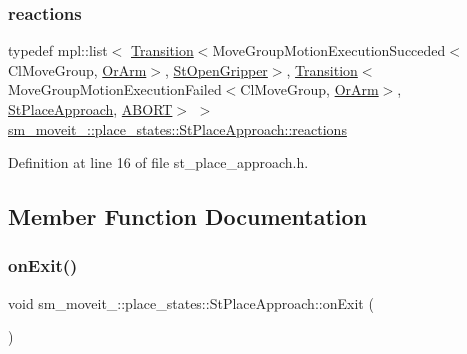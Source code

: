 \subsubsection{\texorpdfstring{reactions}{reactions}}
{\footnotesize\ttfamily typedef mpl\+::list$<$ \hyperlink{classsmacc_1_1Transition}{Transition}$<$Move\+Group\+Motion\+Execution\+Succeded$<$Cl\+Move\+Group, \hyperlink{classsm__moveit__4_1_1OrArm}{Or\+Arm}$>$, \hyperlink{structsm__moveit__4_1_1place__states_1_1StOpenGripper}{St\+Open\+Gripper}$>$, \hyperlink{classsmacc_1_1Transition}{Transition}$<$Move\+Group\+Motion\+Execution\+Failed$<$Cl\+Move\+Group, \hyperlink{classsm__moveit__4_1_1OrArm}{Or\+Arm}$>$, \hyperlink{structsm__moveit__4_1_1place__states_1_1StPlaceApproach}{St\+Place\+Approach}, \hyperlink{structsmacc_1_1default__transition__tags_1_1ABORT}{A\+B\+O\+RT}$>$ $>$ \hyperlink{structsm__moveit__4_1_1place__states_1_1StPlaceApproach_a9aed5942585d30a8f47a96e749f6fa6a}{sm\+\_\+moveit\+\_\+::place\+\_\+states\+::\+St\+Place\+Approach\+::reactions}}



Definition at line 16 of file st\+\_\+place\+\_\+approach.\+h.



\subsection{Member Function Documentation}
\mbox{\label{structsm__moveit__4_1_1place__states_1_1StPlaceApproach_a48540a31af65f96b2a58aeacbab98d15}} 
\subsubsection{\texorpdfstring{on\+Exit()}{onExit()}}
{\footnotesize\ttfamily void sm\+\_\+moveit\+\_\+::place\+\_\+states\+::\+St\+Place\+Approach\+::on\+Exit (\begin{DoxyParamCaption}{ }\end{DoxyParamCaption})\hspace{0.3cm}{\ttfamily [inline]}}



